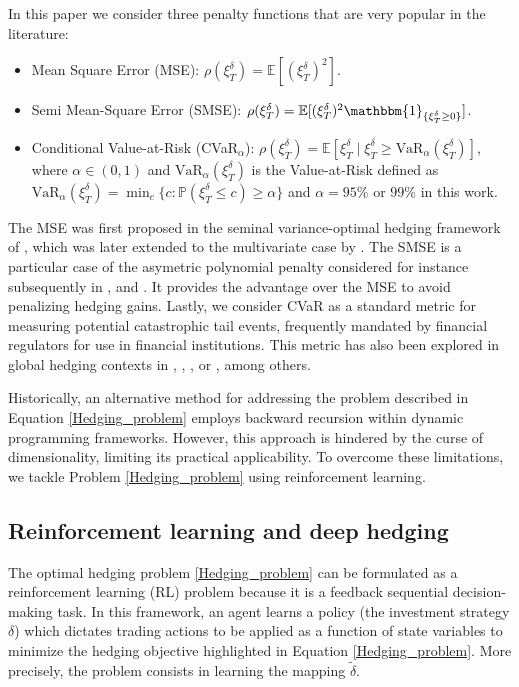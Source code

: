 \documentclass[12pt]{article}
\begin{document}
In this paper we consider three penalty functions that are very popular in the literature:
\begin{itemize}
    \item Mean Square Error (MSE): $\rho(\xi_{T}^{\delta})= \mathbb{E}[(\xi_{T}^{\delta})^{2}]$.
    \item Semi Mean-Square Error (SMSE): $\rho(\xi_{T}^{\delta})= \mathbb{E}[(\xi_{T}^{\delta})^{2}\mathbbm{1}_{\{\xi_{T}^{\delta}\geq 0\}}]$.
    \item Conditional Value-at-Risk (CVaR$_\alpha$): $\rho(\xi_{T}^{\delta})=\mathbb{E}[\xi_{T}^{\delta}\mid \xi_{T}^{\delta}\geq \mbox{VaR}_{\alpha}(\xi_{T}^{\delta})]$, where $\alpha \in (0,1)$ and $\mbox{VaR}_{\alpha}(\xi_{T}^{\delta})$ is the Value-at-Risk defined as $\mbox{VaR}_{\alpha}(\xi_{T}^{\delta}) = \min_{c}\{ c:\mathbb{P}(\xi_{T}^{\delta}\leq c)\geq \alpha \}$ and $\alpha=95\%$ or $99\%$ in this work.
\end{itemize}
The MSE was first proposed in the seminal variance-optimal hedging framework of \cite{Schweizer}, which was later extended to the multivariate case by \cite{Remillard}. The SMSE is a particular case of the asymetric polynomial penalty considered for instance subsequently in \cite{pham2000dynamic}, \cite{FRANCOIS2014312} and \cite{carbonneau2023deep}. It provides the advantage over the MSE to avoid penalizing hedging gains. Lastly, we consider CVaR as a standard metric for measuring potential catastrophic tail events, frequently mandated by financial regulators for use in financial institutions. This metric has also been explored in global hedging contexts in \cite{melnikov2012dynamic}, \cite{GodinCVaR}, \cite{buehler2019deep}, \cite{carbonneau2021equal} or \cite{cao2023gamma}, among others. 

Historically, an alternative method for addressing the problem described in Equation \eqref{Hedging_problem} employs backward recursion within dynamic programming frameworks. However, this approach is hindered by the curse of dimensionality, limiting its practical applicability. 
To overcome these limitations, we tackle Problem \eqref{Hedging_problem} using reinforcement learning.

\subsection{Reinforcement learning and deep hedging}\label{subsec:state_space}

The optimal hedging problem \eqref{Hedging_problem} can be formulated as a reinforcement learning (RL) problem because it is a feedback sequential decision-making task. In this framework, an agent learns a policy (the investment strategy $\delta$) which dictates trading actions to be applied as a function of state variables to minimize the hedging objective highlighted in Equation \eqref{Hedging_problem}. More precisely, the problem consists in learning the mapping $\tilde{\delta}$.
\end{document}
